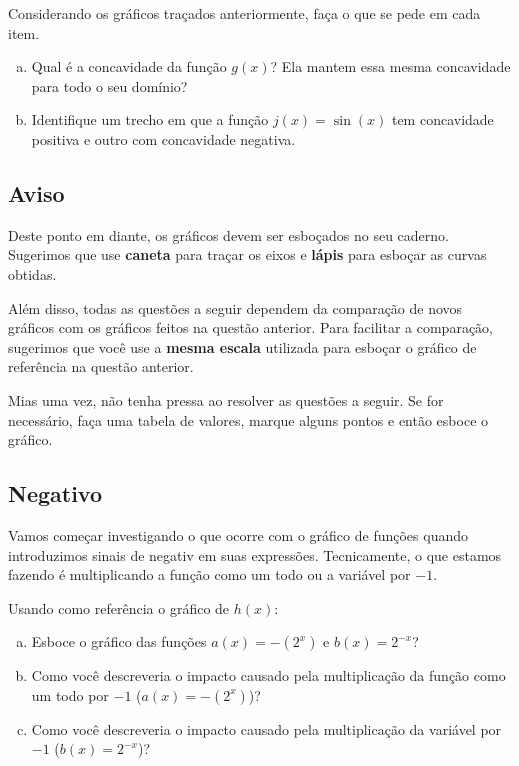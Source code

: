 \documentclass[main_estudante.tex]{subfiles}
\begin{document}
\begin{questao}
Considerando os gráficos traçados anteriormente, faça o que se pede em cada item.
\begin{enumerate}[a)]
\item Qual é a concavidade da função $g(x)$? Ela mantem essa mesma concavidade para todo o seu domínio?
\item Identifique um trecho em que a função $j(x)=\sin(x)$ tem concavidade positiva e outro com concavidade negativa.
\end{enumerate}
\end{questao}

\subsection*{Aviso}

Deste ponto em diante, os gráficos devem ser esboçados no seu caderno. Sugerimos que use \textbf{caneta} para traçar os eixos e \textbf{lápis} para esboçar as curvas obtidas.

Além disso, todas as questões a seguir dependem da comparação de novos gráficos com os gráficos feitos na questão anterior. Para facilitar a comparação, sugerimos que você use a \textbf{mesma escala} utilizada para esboçar o gráfico de referência na questão anterior.

Mias uma vez, não tenha pressa ao resolver as questões a seguir. Se for necessário, faça uma tabela de valores, marque alguns pontos e então esboce o gráfico.

\subsection*{Negativo}

Vamos começar investigando o que ocorre com o gráfico de funções quando introduzimos sinais de negativ em suas expressões. Tecnicamente, o que estamos fazendo é multiplicando a função como um todo ou a variável por $-1$.

\begin{questao}
Usando como referência o gráfico de $h(x)$:
\begin{enumerate}[a)]
\item Esboce o gráfico das funções $a(x)=-(2^x)$ e $b(x)=2^{-x}$?
\item Como você descreveria o impacto causado pela multiplicação da função como um todo por $-1$ ($a(x)=-(2^x)$)?
\item Como você descreveria o impacto causado pela multiplicação da variável por $-1$ ($b(x)=2^{-x}$)?
\end{enumerate}
\end{questao}
\end{document}
